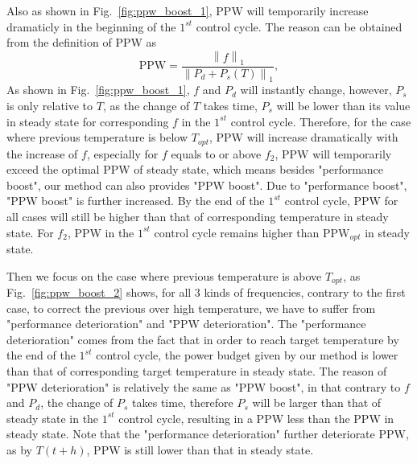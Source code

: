 Also as shown in Fig.~\ref{fig:ppw_boost_1}, PPW will temporarily increase dramaticly in the beginning of the $1^{st}$ control cycle. The reason can be obtained from the definition of PPW as
\begin{equation}\label{eq:ppw_detail}
\text{PPW} = \frac{\left \| f \right \|_{1}}{\left \| P_{d}+P_{s}(T) \right \|_{1}},
\end{equation}
As shown in Fig.~\ref{fig:ppw_boost_1}, $f$ and $P_{d}$ will instantly change, however, $P_{s}$ is only relative to $T$, as the change of $T$ takes time, $P_{s}$ will be lower than its value in steady state for corresponding $f$ in the $1^{st}$ control cycle. Therefore, for the case where previous temperature is below $T_{opt}$, PPW will increase dramatically with the increase of $f$, especially for $f$ equals to or above $f_{2}$, PPW will temporarily exceed the optimal PPW of steady state, which means besides "performance boost", our method can also provides "PPW boost". Due to "performance boost", "PPW boost" is further increased. By the end of the $1^{st}$ control cycle, PPW for all cases will still be higher than that of corresponding temperature in steady state. For $f_{2}$, PPW in the $1^{st}$ control cycle remains higher than $\text{PPW}_{opt}$ in steady state.



Then we focus on the case where previous temperature is above $T_{opt}$, as Fig.~\ref{fig:ppw_boost_2} shows, for all $3$ kinds of frequencies, contrary to the first case, to correct the previous over high temperature, we have to suffer from "performance deterioration" and "PPW deterioration". The "performance deterioration" comes from the fact that in order to reach target temperature by the end of the $1^{st}$ control cycle, the power budget given by our method is lower than that of corresponding target temperature in steady state. The reason of "PPW deterioration" is relatively the same as "PPW boost", in that contrary to $f$ and $P_{d}$, the change of $P_{s}$ takes time, therefore $P_{s}$ will be larger than that of steady state in the $1^{st}$ control cycle, resulting in a PPW less than the PPW in steady state. Note that the "performance deterioration" further deteriorate PPW, as by $T(t+h)$, PPW is still lower than that in steady state.


